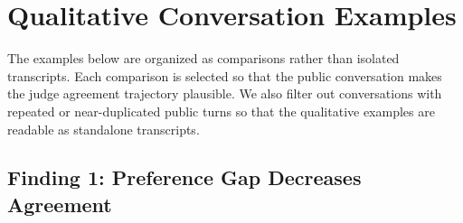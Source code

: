 \section{Qualitative Conversation Examples}
\label{sec:qual-failures}

The examples below are organized as comparisons rather than isolated transcripts. Each comparison is selected so that the public conversation makes the judge agreement trajectory plausible. We also filter out conversations with repeated or near-duplicated public turns so that the qualitative examples are readable as standalone transcripts.

\subsection{Finding 1: Preference Gap Decreases Agreement}

